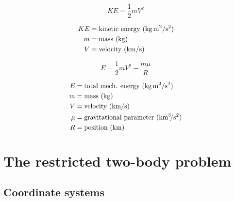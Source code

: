 \documentclass{article}
\begin{document}
\begin{multicols}{2}
	\begin{equation*}
	\boxed{KE = \dfrac{1}{2} m V^{2}}
	\end{equation*}

	\begin{align*}
	KE &= \text{kinetic energy (\si{\kilo\gram\,\meter\squared\per\second\squared)}}\\
	m &= \text{mass (\si{\kilo\gram})}\\
	V &= \text{velocity (\si{\kilo\meter\per\second}})\\
	\end{align*}

	\vfill\null
	\columnbreak

	\begin{equation*}
	\boxed{E = \dfrac{1}{2} m V^{2} - \dfrac{m\mu}{R}}
	\end{equation*}

	\begin{align*}
	E &= \text{total mech. energy (\si{\kilo\gram\,\meter\squared\per\second\squared)}}\\
	m &= \text{mass (\si{\kilo\gram})}\\
	V &= \text{velocity (\si{\kilo\meter\per\second}})\\
	\mu &= \text{gravitational parameter (\si{\kilo\meter\cubed\per\second\squared})}\\
	R &= \text{position (\si{\kilo\meter})}\\
	\end{align*}
	\vfill\null
\end{multicols}

\section{The restricted two-body problem}
\subsection{Coordinate systems}
\end{document}
